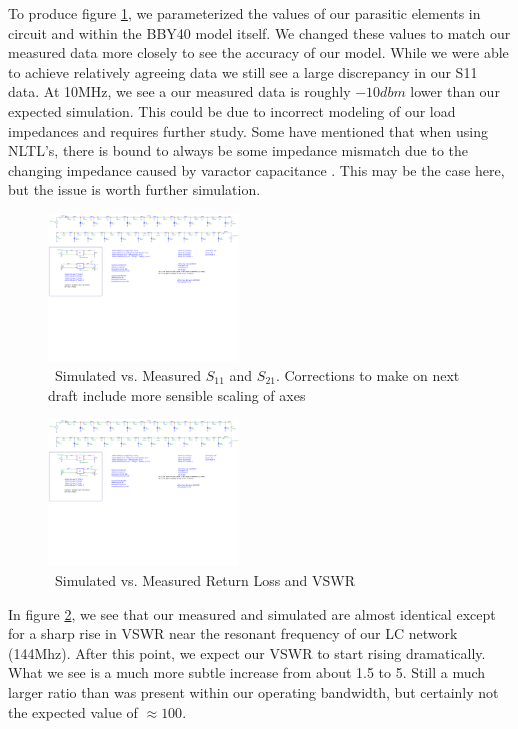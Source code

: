 \documentclass[journal]{IEEEtran} \usepackage[english]{babel}
\begin{document}
To produce figure \ref{fig:S11_S21}, we parameterized the values of our
parasitic elements in circuit and within the BBY40 model itself. We changed
these values to match our measured data more closely to see the accuracy of our
model. While we were able to achieve relatively agreeing data we still see a
large discrepancy in our S11 data. At 10MHz, we see a our measured data is
roughly $-10dbm$ lower than our expected simulation. This could be due to
incorrect modeling of our load impedances and requires further study. Some have
mentioned that when using NLTL's, there is bound to always be some impedance
mismatch due to the changing impedance caused by varactor capacitance
\cite{wilson1991pulse}. This may be the case here, but the issue is worth
further simulation.

\begin{figure}[htb]
\centering
\includegraphics[width=0.45\textwidth,page = 2]{Fixed_ZeroBias_Sparam_Sims.pdf}
\caption{\ Simulated vs. Measured $S_{11}$ and $S_{21}$. Corrections to make on next draft include more sensible scaling of axes
}\label{fig:S11_S21}
\end{figure}



\begin{figure}[htb]
\centering
\includegraphics[width=0.45\textwidth,page = 3]{Fixed_ZeroBias_Sparam_Sims.pdf}
\caption{\ Simulated vs. Measured Return Loss and VSWR
}\label{fig:VSWRandReturnLoss}
\end{figure}

In figure \ref{fig:VSWRandReturnLoss}, we see that our measured and simulated
are almost identical except for a sharp rise in VSWR near the resonant frequency
of our LC network (144Mhz). After this point, we expect our VSWR to start rising
dramatically. What we see is a much more subtle increase from about 1.5 to 5.
Still a much larger ratio than was present within our operating bandwidth, but
certainly not the expected value of $\approx 100$.
\end{document}
